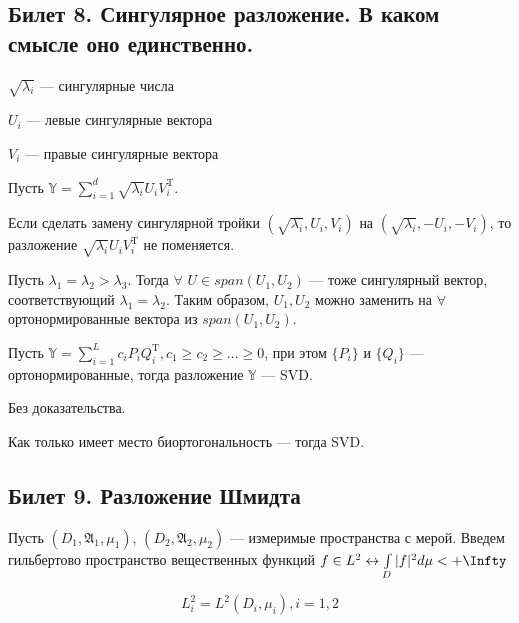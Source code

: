 \subsection{Билет 8. Сингулярное разложение. В каком смысле оно единственно.}

\begin{design}[1]
$\sqrt{\lambda_i}$ --- сингулярные числа
\end{design}
\begin{design}[2]
$U_i$ --- левые сингулярные вектора
\end{design}
\begin{design}[3]
$V_i$ --- правые сингулярные вектора
\end{design}

Пусть $\mathbb{Y} = \sum \limits_{i = 1}^d \sqrt{\lambda_i} U_i V_i^{\mathrm{T}}$.

Если сделать замену сингулярной тройки $(\sqrt{\lambda_i}, U_i, V_i)$ на $(\sqrt{\lambda_i}, -U_i, -V_i)$, то разложение $\sqrt{\lambda_i} U_i V_i^{\mathrm{T}}$ не поменяется.

Пусть $\lambda_1 = \lambda_2 > \lambda_3$. Тогда $\forall$ $U \in span(U_1, U_2)$ --- тоже сингулярный вектор, соответствующий $\lambda_1 = \lambda_2$. Таким образом, $U_1, U_2$ можно заменить на $\forall$ ортонормированные вектора из $span(U_1,U_2)$.

\begin{sug}
Пусть $\mathbb{Y} = \sum \limits_{i = 1}^L c_i P_i Q_i^{\mathrm{T}}, c_1 \geqslant c_2 \geqslant \dots \geqslant 0$, при этом $\{P_i\}$ и $\{Q_i\}$ --- ортонормированные, тогда разложение $\mathbb{Y}$ --- SVD.
\end{sug}

Без доказательства.

\begin{note}
Как только имеет место биортогональность --- тогда SVD.
\end{note}


\subsection{Билет 9. Разложение Шмидта}

Пусть $(D_1, \mathfrak{A}_1, \mu_1)$, $(D_2, \mathfrak{A}_2, \mu_2)$ --- измеримые пространства с мерой. Введем гильбертово пространство вещественных функций $f \in L^2 \leftrightarrow \int \limits_{D} |f|^2 d\mu < + \Infty$

\begin{equation*}
L_i^2 = L^2(D_i,\mu_i), i = 1,2
\end{equation*}

